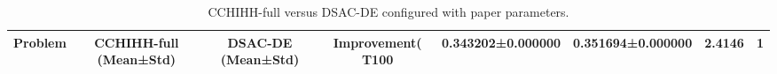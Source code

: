 \begin{table}[t]
\centering
\caption{CCHIHH-full versus DSAC-DE configured with paper parameters.}
\label{tab:dsac_de_vs_full}
\begin{tabular}{lcccc}
\hline
Problem & CCHIHH-full (Mean±Std) & DSAC-DE (Mean±Std) & Improvement(%
\hline
T100 & 0.343202±0.000000 & 0.351694±0.000000 & 2.4146 & 1 \\
\hline
\end{tabular}
\end{table}